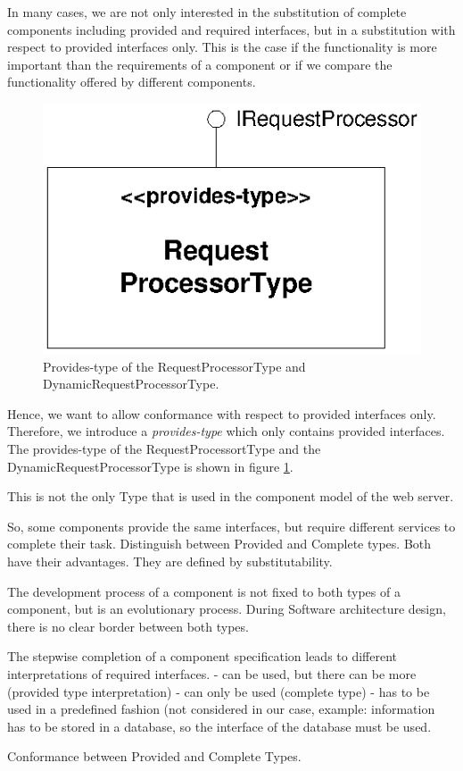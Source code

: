 In many cases, we are not only interested in the substitution of complete components including provided and required interfaces, but in a substitution with respect to provided interfaces only. This is the case if the functionality is more important than the requirements of a component or if we compare the functionality offered by different components. 

\begin{figure}[htbp]
\centering
\includegraphics[scale=0.85]{example/ProvidesType}
\caption{Provides-type of the RequestProcessorType and DynamicRequestProcessorType.}
\label{fig:ProvidesType}
\end{figure}

Hence, we want to allow conformance with respect to provided interfaces only. Therefore, we introduce a \emph{provides-type} which only contains provided interfaces. The provides-type of the RequestProcessortType and the DynamicRequestProcessorType is shown in figure \ref{fig:ProvidesType}. 


This is not the only Type that is used in the component model of the web server.

So, some components provide the same interfaces, but require different services to complete their task.
Distinguish between Provided and Complete types. Both have their advantages. They are defined by substitutability. 

The development process of a component is not fixed to both types of a component, but is an evolutionary process.
During Software architecture design, there is no clear border between both types.

The stepwise completion of a component specification leads to different interpretations of required interfaces.
-	can be used, but there can be more (provided type interpretation)
-	can only be used (complete type)
-	has to be used in a predefined fashion (not considered in our case, example: information has to be stored in a database, so the interface of the database must be used.

Conformance between Provided and Complete Types.
